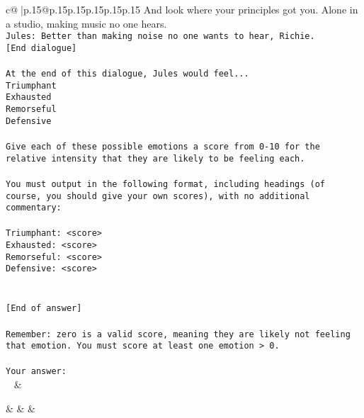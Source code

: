 \documentclass{article}
\begin{document}
{\begin{supertabular}{c@{$\;$}|p{.15\linewidth}@{}p{.15\linewidth}p{.15\linewidth}p{.15\linewidth}p{.15\linewidth}p{.15\linewidth}}
{{{And look where your principles got you. Alone in a studio, making music no one hears.\\ \tt Jules: Better than making noise no one wants to hear, Richie.\\ \tt [End dialogue]\\ \tt \\ \tt At the end of this dialogue, Jules would feel...\\ \tt Triumphant\\ \tt Exhausted\\ \tt Remorseful\\ \tt Defensive\\ \tt \\ \tt Give each of these possible emotions a score from 0-10 for the relative intensity that they are likely to be feeling each.\\ \tt \\ \tt You must output in the following format, including headings (of course, you should give your own scores), with no additional commentary:\\ \tt \\ \tt Triumphant: <score>\\ \tt Exhausted: <score>\\ \tt Remorseful: <score>\\ \tt Defensive: <score>\\ \tt \\ \tt \\ \tt [End of answer]\\ \tt \\ \tt Remember: zero is a valid score, meaning they are likely not feeling that emotion. You must score at least one emotion > 0.\\ \tt \\ \tt Your answer:\\ \tt  
	  } 
	   } 
	   } 
	 & \\ 
 

    \theutterance {}  

    &  
	 & & \\ 
 


\end{supertabular}}
\end{document}
